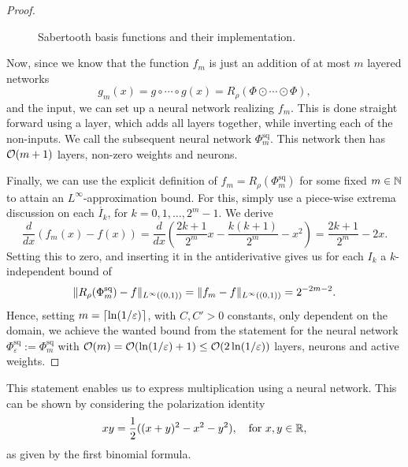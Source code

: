 \begin{proof}
\begin{figure}[tb]
        \caption{Sabertooth basis functions and their implementation.}
        \label{fig:tooth-function}
    \end{figure}


    Now, since we know that the function $f_m$ is just an addition of at most $m$ layered networks
    \begin{equation*}
        g_m(x) = g \circ \cdots \circ g (x) = R_\rho(\Phi \odot \cdots \odot \Phi),    
    \end{equation*} 
    and the input, 
    we can set up a neural network realizing $f_m$. This is done straight forward using a layer, which adds
    all layers together, while inverting each of the non-inputs. We call the subsequent neural network 
    $\Phi^\text{sq}_m$. This network then has $\mathcal{O}(m + 1)$ layers, non-zero weights and neurons.
      
    Finally, we can use the explicit definition of $f_m = R_\rho(\Phi^\text{sq}_m)$ for some fixed $m \in \mathbb{N}$
    to attain an $L^\infty$-approximation bound. For this, simply use a piece-wise extrema discussion on
    each $\mathring{I_k}$, for $k = 0,1, \dots, 2^m -1$. We derive
    \begin{equation*}
        \frac{d}{dx}\left(f_m(x) - f(x)\right) = \frac{d}{dx}\left( 
            \frac{2k+1}{2^m} x - \frac{k(k+1)}{2^m} - x^2
         \right) = \frac{2k+1}{2^m} - 2x.
    \end{equation*}
    Setting this to zero, and inserting it in the antiderivative gives us for each $I_k$ a $k$-independent bound of
    \begin{equation*}
        \lVert R_\rho(\Phi^\text{sq}_m) - f \rVert_{L^\infty((0,1))} = \lVert f_m - f \rVert_{L^\infty((0,1))} = 2^{-2m-2}.
    \end{equation*}
    Hence, setting $m = \left\lceil\ln(1/\varepsilon)\right\rceil$, with $C, C' > 0$ constants, only dependent on
    the domain, we achieve the wanted bound from the statement for the neural network
    $\Phi^{\text{sq}}_\varepsilon := \Phi^\text{sq}_m$ with $\mathcal{O}(m) = 
    \mathcal{O}(\ln(1 / \varepsilon) + 1) \leq \mathcal{O}(2 \ln(1 / \varepsilon))$
    layers, neurons and active weights.
\end{proof}

This statement enables us to express multiplication using a neural network. This can be shown
by considering the polarization identity
\begin{equation} \label{eq: polarization identify}
    xy = \frac{1}{2}((x + y)^2 - x^2 - y^2), \quad \text{for } x,y \in \mathbb{R}, 
\end{equation}
as given by the first binomial formula.

